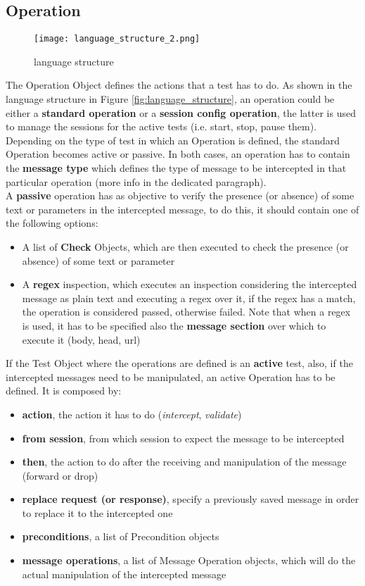 \subsection{Operation}
\label{sec:operation}
\begin{wrapfigure}{r}{0.4\textwidth}
    \texttt{[image: language\_structure\_2.png]}
    \caption{language structure}
    \label{fig:language_structure_2}
\end{wrapfigure}

The Operation Object defines the actions that a test has to do. As shown in the language structure in Figure \ref{fig:language_structure}, an operation could be either a \textbf{standard operation} or a \textbf{session config operation}, the latter is used to manage the sessions for the active tests (i.e. start, stop, pause them). Depending on the type of test in which an Operation is defined, the standard Operation becomes active or passive.
In both cases, an operation has to contain the \textbf{message type} which defines the type of message to be intercepted in that particular operation (more info in the dedicated paragraph).
\\A \textbf{passive} operation has as objective to verify the presence (or absence) of some text or parameters in the intercepted message, to do this, it should contain one of the following options:
\begin{itemize}
    \item A list of \textbf{Check} Objects, which are then executed to check the presence (or absence) of some text or parameter
    \item A \textbf{regex} inspection, which executes an inspection considering the intercepted message as plain text and executing a regex over it, if the regex has a match, the operation is considered passed, otherwise failed. Note that when a regex is used, it has to be specified also the \textbf{message section} over which to execute it (body, head, url)
\end{itemize}

If the Test Object where the operations are defined is an \textbf{active} test, also, if the intercepted messages need to be manipulated, an active Operation has to be defined. It is composed by:
\begin{itemize}
    \item \textbf{action}, the action it has to do (\textit{intercept}, \textit{validate})
    \item \textbf{from session}, from which session to expect the message to be intercepted
    \item \textbf{then}, the action to do after the receiving and manipulation of the message (forward or drop)
    \item \textbf{replace request (or response)}, specify a previously saved message in order to replace it to the intercepted one
    \item \textbf{preconditions}, a list of Precondition objects
    \item \textbf{message operations}, a list of Message Operation objects, which will do the actual manipulation of the intercepted message
\end{itemize}

